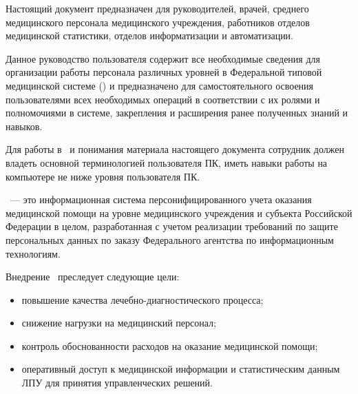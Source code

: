\newpage
{}

 Настоящий документ предназначен для руководителей, врачей, среднего медицинского персонала медицинского учреждения, работников отделов медицинской статистики, отделов информатизации и автоматизации. 
 
 Данное руководство пользователя содержит все необходимые сведения для организации работы персонала различных уровней в Федеральной типовой медицинской системе (\tmis) и предназначено для самостоятельного освоения пользователями всех необходимых операций в соответствии с их ролями и полномочиями в системе, закрепления и расширения ранее полученных знаний и навыков.

 Для работы в \tmis~и понимания материала настоящего документа сотрудник должен владеть основной терминологией пользователя ПК, иметь навыки работы на компьютере не ниже уровня пользователя ПК.

 \tmis~--- это информационная система персонифицированного учета оказания медицинской помощи на уровне медицинского учреждения и субъекта Российской Федерации в целом, разработанная с учетом реализации требований по защите персональных данных по заказу Федерального агентства по информационным технологиям.

 Внедрение \tmis~преследует следующие цели:
\begin{itemize}
 	\item повышение качества лечебно-диагностического процесса;
 	\item снижение нагрузки на медицинский персонал;
 	\item контроль обоснованности расходов на оказание медицинской помощи;
 	\item оперативный доступ к медицинской информации и статистическим данным ЛПУ для принятия управленческих решений.
\end{itemize}


